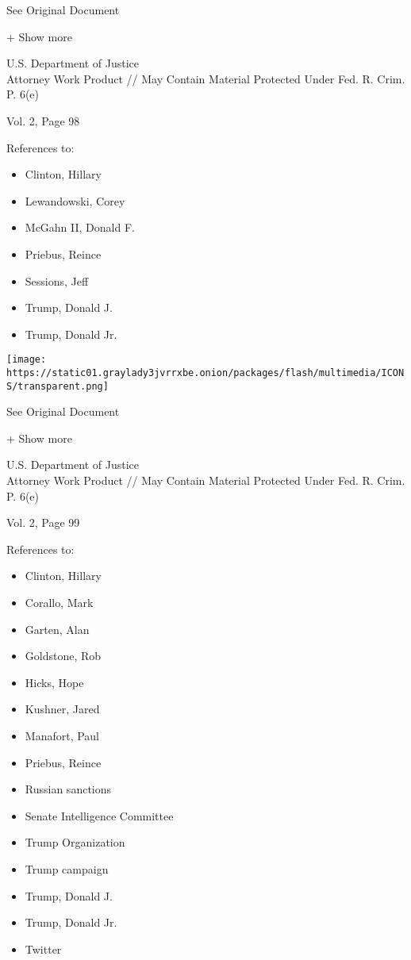 See Original Document

+ Show more

U.S. Department of Justice\\
Attorney Work Product // May Contain Material Protected Under Fed. R.
Crim. P. 6(e)

Vol. 2, Page 98

References to:

\begin{itemize}
\tightlist
\item
  Clinton, Hillary
\item
  Lewandowski, Corey
\item
  McGahn II, Donald F.
\item
  Priebus, Reince
\item
  Sessions, Jeff
\item
  Trump, Donald J.
\item
  Trump, Donald Jr.
\end{itemize}

\protect\hyperlink{}{}

\texttt{[image: https://static01.graylady3jvrrxbe.onion/packages/flash/multimedia/ICONS/transparent.png]}

See Original Document

+ Show more

U.S. Department of Justice\\
Attorney Work Product // May Contain Material Protected Under Fed. R.
Crim. P. 6(e)

Vol. 2, Page 99

References to:

\begin{itemize}
\tightlist
\item
  Clinton, Hillary
\item
  Corallo, Mark
\item
  Garten, Alan
\item
  Goldstone, Rob
\item
  Hicks, Hope
\item
  Kushner, Jared
\item
  Manafort, Paul 
\item
  Priebus, Reince
\item
  Russian sanctions
\item
  Senate Intelligence Committee
\item
  Trump Organization
\item
  Trump campaign
\item
  Trump, Donald J.
\item
  Trump, Donald Jr.
\item
  Twitter
\end{itemize}

